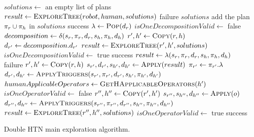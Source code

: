\documentclass[a4paper,11pt,twoside]{StyleThese}
\begin{document}
\begin{algorithm}[htb!]
\begin{algorithmic}[1]
\State $solutions \leftarrow$ an empty list of plans
\State $result \leftarrow \textsc{ExploreTree}(robot, human, solutions)$
 \Return failure \EndIf
\State \Return $solutions$
\EndFunction
\Statex
{}
	\State add the plan $\pi_r \cup \pi_h$ in $solutions$
	\State \Return success
\EndIf
\State $\lambda \leftarrow \textsc{Pop}(d_r)$
	\State $isOneDecompositionValid \leftarrow$ false
		\State $decomposition \leftarrow \delta(s_r, \pi_r, d_r, s_h, \pi_h, d_h)$
			\State $r', h' \leftarrow \textsc{Copy}(r, h)$ 
			\State $d_{r'} \leftarrow decomposition.d_{r'}$
			\State $result \leftarrow \textsc{ExploreTree}(r', h', solutions)$
				$isOneDecompositionValid \leftarrow$ true
			\EndIf
		\EndIf
	\EndFor
	 \Return success \EndIf
\EndIf
{}
	\State $result \leftarrow \lambda(s_r, \pi_r, d_r, s_h, \pi_h, d_h)$
		\Return failure
	\EndIf
	\State $r', h' \leftarrow \textsc{Copy}(r, h)$ 
	\State $s_{r'}, d_{r'}, s_{h'}, d_{h'} \leftarrow \textsc{Apply}(result)$
	\State $\pi_{r'} \leftarrow \pi_{r'}.\lambda$
	\State $d_{r'}, d_{h'} \leftarrow \textsc{ApplyTriggers}(s_{r'}, \pi_{r'}, d_{r'}, s_{h'}, \pi_{h'}, d_{h'})$
	\State $humanApplicableOperators \leftarrow \textsc{GetHApplicableOperators}(h')$
	\State $isOneOperatorValid \leftarrow$ false
		\State $r'', h'' \leftarrow \textsc{Copy}(r', h')$
		\State $s_{r''}, s_{h''}, d_{h''} \leftarrow \textsc{Apply}(o)$
		\State $d_{r''}, d_{h''} \leftarrow \textsc{ApplyTriggers}(s_{r''}, \pi_{r''}, d_{r''}, s_{h''}, \pi_{h''}, d_{h''})$
		\State $result \leftarrow \textsc{ExploreTree}(r'', h'', solutions)$
		 $isOneOperatorValid \leftarrow$ true \EndIf
	\EndFor
	 \Return success \EndIf
\EndIf
\EndFunction
\end{algorithmic}
 \caption{Double HTN main exploration algorithm.}
  \label{alg:seek_plans}
\end{algorithm}
\end{document}
